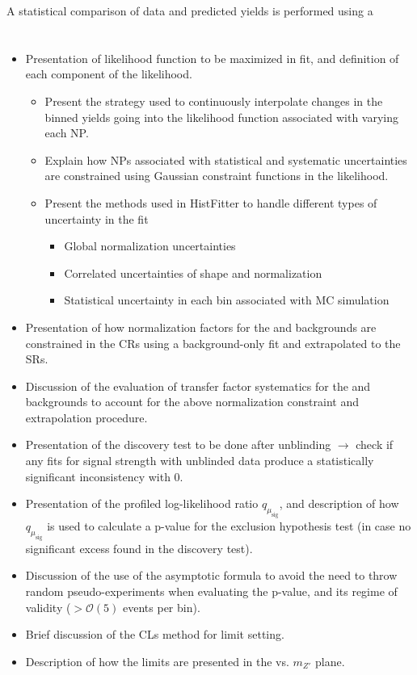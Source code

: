 \label{chapter:stat}

A statistical comparison of data and predicted yields is performed using a 

\section{}

\begin{itemize}
\item Presentation of likelihood function to be maximized in fit, and definition of each component of the likelihood.
\begin{itemize}
\item Present the strategy used to continuously interpolate changes in the binned yields going into the likelihood function associated with varying each NP.
\item Explain how NPs associated with statistical and systematic uncertainties are constrained using Gaussian constraint functions in the likelihood.
\item Present the methods used in HistFitter to handle different types of uncertainty in the fit
\begin{itemize}
\item Global normalization uncertainties
\item Correlated uncertainties of shape and normalization
\item Statistical uncertainty in each bin associated with MC simulation
\end{itemize}
\end{itemize}
\item Presentation of how normalization factors for the \wjets and \ttbar backgrounds are constrained in the CRs using a background-only fit and extrapolated to the SRs. 
\item Discussion of the evaluation of transfer factor systematics for the \wjets and \ttbar backgrounds to account for the above normalization constraint and extrapolation procedure.
\item Presentation of the discovery test to be done after unblinding $\rightarrow$ check if any fits for signal strength with unblinded data produce a statistically significant inconsistency with 0.
\item Presentation of the profiled log-likelihood ratio $q_{\mu_\text{sig}}$, and description of how $q_{\mu_\text{sig}}$ is used to calculate a p-value for the exclusion hypothesis test (in case no significant excess found in the discovery test).
\item Discussion of the use of the asymptotic formula to avoid the need to throw random pseudo-experiments when evaluating the p-value, and its regime of validity ($>\mathcal{O}(5)$ events per bin).
\item Brief discussion of the CLs method for limit setting.
\item Description of how the limits are presented in the \ms vs. $m_{Z'}$ plane.
\end{itemize}
